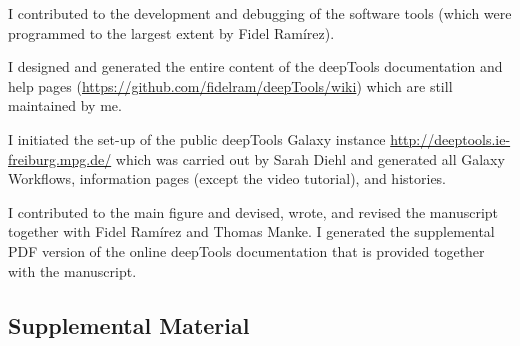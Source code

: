 I contributed to the development and debugging of the software tools (which were programmed to the largest extent by Fidel Ramírez).

I designed and generated the entire content of the deepTools documentation and help pages (\url{https://github.com/fidelram/deepTools/wiki}) which are still maintained by me.

I initiated the set-up of the public deepTools Galaxy instance \url{http://deeptools.ie-freiburg.mpg.de/} which was carried out by Sarah Diehl and generated all Galaxy Workflows, information pages (except the video tutorial), and histories.

I contributed to the main figure and devised, wrote, and revised the manuscript together with Fidel Ramírez and Thomas Manke. I generated the supplemental PDF version of the online deepTools documentation that is provided together with the manuscript.




\subsection{Supplemental Material}

